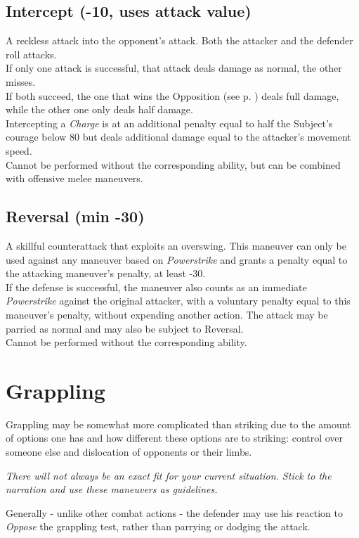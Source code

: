 \subsection*{Intercept (-10, uses attack value)}
A reckless attack into the opponent's attack. Both the attacker and the defender roll attacks.\\
If only one attack is successful, that attack deals damage as normal, the other misses.\\
If both succeed, the one that wins the Opposition (see p. \pageref{sec:opposedchecks}) deals full damage, while the other one only deals half damage.\\
Intercepting a \emph{Charge} is at an additional penalty equal to half the Subject’s courage below 80 but deals additional damage equal to the attacker’s movement speed.
\\%
Cannot be performed without the corresponding ability,
	but can be combined with offensive melee maneuvers.
\subsection*{Reversal (min -30)}
A skillful counterattack that exploits an overswing.
This maneuver can only be used against any maneuver based on \emph{Powerstrike}
	and grants a penalty equal to the attacking maneuver's penalty, at least -30.
\\%
If the defense is successful,
	the maneuver also counts as an immediate \emph{Powerstrike} against the original attacker,
	with a voluntary penalty equal to this maneuver’s penalty,
	without expending another action.
The attack may be parried as normal
	and may also be subject to Reversal.
\\%
Cannot be performed without the corresponding ability.

\section{Grappling}
Grappling may be somewhat more complicated than striking due to the amount of options one has and how different these options are to striking: control over someone else and dislocation of opponents or their limbs.
\begin{exampleblock}
	\itshape
	There will not always be an exact fit for your current situation.
	Stick to the narration
		and use these maneuvers as guidelines.
\end{exampleblock}
Generally - unlike other combat actions -
	the defender may use his reaction to \emph{Oppose} the grappling test,
	rather than parrying or dodging the attack.

